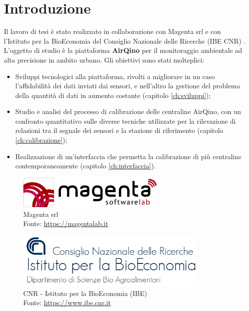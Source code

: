 \chapter{Introduzione}\label{ch:introduzione}
Il lavoro di tesi è stato realizzato in collaborazione con Magenta srl \cite{magenta} e con l'Istituto per la BioEconomia del Consiglio Nazionale delle Ricerche (IBE CNR) \cite{ibe}.\\

L'oggetto di studio è la piattaforma \textbf{AirQino} \cite{airqino} per il monitoraggio ambientale ad alta precisione in ambito urbano. Gli obiettivi sono stati molteplici:
\begin{itemize}
  \item Sviluppi tecnologici alla piattaforma, rivolti a migliorare in un caso l'affidabilità dei dati inviati dai sensori, e nell'altro la gestione del problema della quantità di dati in aumento costante (capitolo \ref{ch:sviluppi});
  \item Studio e analisi del processo di calibrazione delle centraline AirQino, con un confronto quantitativo sulle diverse tecniche utilizzate per la rilevazione di relazioni tra il segnale dei sensori e la stazione di riferimento (capitolo \ref{ch:calibrazione});
  \item Realizzazione di un'interfaccia che permetta la calibrazione di più centraline contemporaneamente  (capitolo \ref{ch:interfaccia}).
\end{itemize}

\begin{figure}[H]
\centering
\captionsetup{justification=centering}
\includegraphics[width=0.65\textwidth,height=\textheight,keepaspectratio]{img/magenta}
\caption{Magenta srl\\Fonte: \url{https://magentalab.it}}
\label{fig:magenta}
\end{figure}

\vspace{3mm}
\begin{figure}[H]
\centering
\captionsetup{justification=centering}
\includegraphics[width=0.85\textwidth,height=\textheight,keepaspectratio]{img/ibe.jpg}
\caption{CNR - Istituto per la BioEconomia (IBE)\\Fonte: \url{https://www.ibe.cnr.it}}
\label{fig:ibe}
\end{figure}

